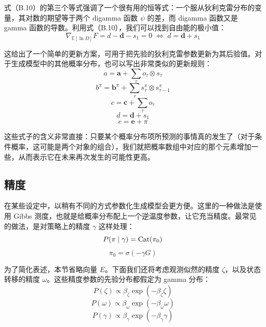 式（B.10）的第三个等式强调了一个很有用的恒等式：一个服从狄利克雷分布的变量，其对数的期望等于两个 digamma 函数 $\psi$ 的差，而 digamma 函数又是 gamma 函数的导数。利用式（B.10），我们可以找到自由能的极小值：
\begin{equation}
\nabla_{\mathbb{E}[\ln D]}F
=
d-\boldsymbol{d}-s_1=0
\;\Leftrightarrow\;
d=\boldsymbol{d}+s_1
\tag{B.11}
\end{equation}

这给出了一个简单的更新方案，可用于把先验的狄利克雷参数更新为其后验值。对于生成模型中的其他概率分布，也可以写出非常类似的更新规则：
\begin{equation}
a=\boldsymbol{a}+\sum_\tau o_\tau\otimes s_\tau
\end{equation}
\begin{equation}
b^\pi=\boldsymbol{b}^\pi+\sum_\tau s_\tau^\pi\otimes s_{\tau-1}^\pi
\end{equation}
\begin{equation}
c=\boldsymbol{c}+\sum_\tau o_\tau
\end{equation}
\begin{equation}
d=\boldsymbol{d}+s_1
\end{equation}
\begin{equation}
e=\boldsymbol{e}+\pi
\tag{B.12}
\end{equation}

这些式子的含义非常直接：只要某个概率分布项所预测的事情真的发生了（对于条件概率，这可能是两个对象的组合），我们就把概率数组中对应的那个元素增加一些，从而表示它在未来再次发生的可能性更高。

\subsection{精度}

在某些设定中，以稍有不同的方式参数化生成模型会更方便。这里的一种做法是使用 Gibbs 测度，也就是给概率分布配上一个逆温度参数，让它充当精度。最常见的做法，是对策略上的精度 $\gamma$ 这样处理：
\begin{equation}
P(\pi\mid \gamma)=\operatorname{Cat}(\pi_0)
\end{equation}
\begin{equation}
\pi_0=\sigma(-\gamma G)
\tag{B.13}
\end{equation}

为了简化表述，本节省略向量 $E$。下面我们还将考虑观测似然的精度 $\zeta$，以及状态转移的精度 $\omega$。这些精度参数的先验分布都假定为 gamma 分布：
\begin{equation}
P(\zeta)\propto \beta_\zeta \exp(-\beta_\zeta \zeta)
\end{equation}
\begin{equation}
P(\omega)\propto \beta_\omega \exp(-\beta_\omega \omega)
\end{equation}
\begin{equation}
P(\gamma)\propto \beta_\gamma \exp(-\beta_\gamma \gamma)
\tag{B.14}
\end{equation}

